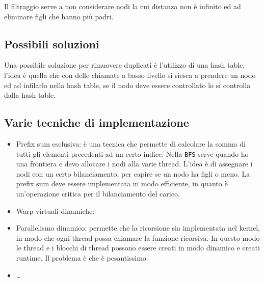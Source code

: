 Il filtraggio serve a non considerare nodi la cui distanza non è infinito 
ed ad eliminare figli che hanno più padri.

\subsection{Possibili soluzioni}
Una possibile soluzione per rimuovere duplicati è l'utilizzo di una 
hash table, l'idea è quella che con delle chiamate a basso livello si 
riesca a prendere un nodo ed ad infilarlo nella hash table, se il nodo
deve essere controllato lo si controlla dalla hash table.

\subsection{Varie tecniche di implementazione}
\begin{itemize}
  \item Prefix sum esclusiva: è una tecnica che permette di calcolare
  la somma di tutti gli elementi precedenti ad un certo indice.
  Nella \texttt{BFS} serve quando ho una frontiera e devo allocare i nodi 
  alla varie thread. L'idea è di assegnare i nodi con un certo bilanciamento, 
  per capire se un nodo ha figli o meno.
  La prefix sum deve essere implementata in modo efficiente, in quanto
  è un'operazione critica per il bilanciamento del carico.
  \item Warp virtuali dinamiche:
  \item Parallelismo dinamico: permette che la ricorsione sia 
  implementata nel kernel, in modo che ogni thread possa chiamare
  la funzione ricorsiva. In questo modo le thread e i blocchi di 
  thread possono essere creati in modo dinamico e creati runtime.
  Il problema è che è pesantissimo.
  \item \dots
\end{itemize}
